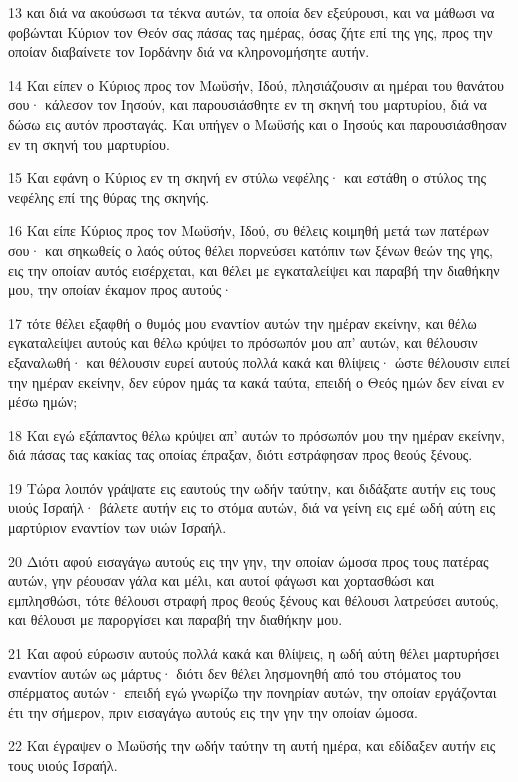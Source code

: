 \par 13 και διά να ακούσωσι τα τέκνα αυτών, τα οποία δεν εξεύρουσι, και να μάθωσι να φοβώνται Κύριον τον Θεόν σας πάσας τας ημέρας, όσας ζήτε επί της γης, προς την οποίαν διαβαίνετε τον Ιορδάνην διά να κληρονομήσητε αυτήν.
\par 14 Και είπεν ο Κύριος προς τον Μωϋσήν, Ιδού, πλησιάζουσιν αι ημέραι του θανάτου σου· κάλεσον τον Ιησούν, και παρουσιάσθητε εν τη σκηνή του μαρτυρίου, διά να δώσω εις αυτόν προσταγάς. Και υπήγεν ο Μωϋσής και ο Ιησούς και παρουσιάσθησαν εν τη σκηνή του μαρτυρίου.
\par 15 Και εφάνη ο Κύριος εν τη σκηνή εν στύλω νεφέλης· και εστάθη ο στύλος της νεφέλης επί της θύρας της σκηνής.
\par 16 Και είπε Κύριος προς τον Μωϋσήν, Ιδού, συ θέλεις κοιμηθή μετά των πατέρων σου· και σηκωθείς ο λαός ούτος θέλει πορνεύσει κατόπιν των ξένων θεών της γης, εις την οποίαν αυτός εισέρχεται, και θέλει με εγκαταλείψει και παραβή την διαθήκην μου, την οποίαν έκαμον προς αυτούς·
\par 17 τότε θέλει εξαφθή ο θυμός μου εναντίον αυτών την ημέραν εκείνην, και θέλω εγκαταλείψει αυτούς και θέλω κρύψει το πρόσωπόν μου απ' αυτών, και θέλουσιν εξαναλωθή· και θέλουσιν ευρεί αυτούς πολλά κακά και θλίψεις· ώστε θέλουσιν ειπεί την ημέραν εκείνην, δεν εύρον ημάς τα κακά ταύτα, επειδή ο Θεός ημών δεν είναι εν μέσω ημών;
\par 18 Και εγώ εξάπαντος θέλω κρύψει απ' αυτών το πρόσωπόν μου την ημέραν εκείνην, διά πάσας τας κακίας τας οποίας έπραξαν, διότι εστράφησαν προς θεούς ξένους.
\par 19 Τώρα λοιπόν γράψατε εις εαυτούς την ωδήν ταύτην, και διδάξατε αυτήν εις τους υιούς Ισραήλ· βάλετε αυτήν εις το στόμα αυτών, διά να γείνη εις εμέ ωδή αύτη εις μαρτύριον εναντίον των υιών Ισραήλ.
\par 20 Διότι αφού εισαγάγω αυτούς εις την γην, την οποίαν ώμοσα προς τους πατέρας αυτών, γην ρέουσαν γάλα και μέλι, και αυτοί φάγωσι και χορτασθώσι και εμπλησθώσι, τότε θέλουσι στραφή προς θεούς ξένους και θέλουσι λατρεύσει αυτούς, και θέλουσι με παροργίσει και παραβή την διαθήκην μου.
\par 21 Και αφού εύρωσιν αυτούς πολλά κακά και θλίψεις, η ωδή αύτη θέλει μαρτυρήσει εναντίον αυτών ως μάρτυς· διότι δεν θέλει λησμονηθή από του στόματος του σπέρματος αυτών· επειδή εγώ γνωρίζω την πονηρίαν αυτών, την οποίαν εργάζονται έτι την σήμερον, πριν εισαγάγω αυτούς εις την γην την οποίαν ώμοσα.
\par 22 Και έγραψεν ο Μωϋσής την ωδήν ταύτην τη αυτή ημέρα, και εδίδαξεν αυτήν εις τους υιούς Ισραήλ.
